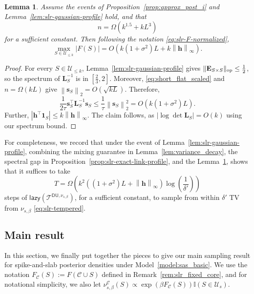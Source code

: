 \documentclass[11pt]{article}
\newtheorem{lemma}{Lemma}
\newcommand{\defeq}{:=}
\newcommand{\norm}[1]{\left\lVert#1\right\rVert}
\newcommand{\normsop}[1]{\lVert#1\rVert_{\textup{op}}}
\newcommand{\half}{\frac{1}{2}}
\newcommand{\1}{\mathbf{1}}
\newcommand{\0}{\mathbf{0}}
\newcommand{\ind}{\mathbb{I}}
\newcommand{\Par}[1]{\left(#1\right)}
\newcommand{\Abs}[1]{\left|#1\right|}
\newcommand{\sig}{\sigma}
\newcommand{\twonorm}[1]{\norm{#1}_2}
\newcommand{\lazy}{\mathsf{lazy}}
\newcommand{\me}{{\mathbf{E}}}
\newcommand{\ml}{{\mathbf{L}}}
\newcommand{\vh}{{\mathbf{h}}}
\newcommand{\vs}{{\mathbf{s}}}
\newcommand{\calC}{{\mathcal{C}}}
\newcommand{\calT}{{\mathcal{T}}}
\newcommand{\calU}{{\mathcal{U}}}
\newcommand{\TDU}[1]{\calT^{\mathsf{DU}, #1}}
\begin{document}
\begin{lemma}
\label{lem:slr-exact-range}
Assume the events of Proposition~\ref{prop:approx_post_i} and Lemma~\ref{lem:slr-gaussian-profile} hold, and that
\[n = \Omega\Par{k^{1.5} + kL^3}\]
for a sufficient constant. Then following the notation \eqref{eq:slr-F-normalized},
\[
    \max_{S\in\calU_{\le k}} |F(S)|
    = O\Par{k\Par{1 + \sig^2}L + k\norm{\vh}_\infty}.
\]
\end{lemma}

\begin{proof}
For every $S \in \calU_{\le k}$, Lemma~\ref{lem:slr-gaussian-profile} gives $\normsop{\me_{S \times S}} \le \half$, so the spectrum of $\ml_S^{-1}$ is in $[\frac 2 3, 2]$. Moreover, \eqref{eq:short_flat_scaled} and $n = \Omega(kL)$ give $\twonorm{\vs_S} = O(\sqrt{kL})$. Therefore,
\[
    \frac{1}{2\tau}
    \vs_S^\top\ml_S^{-1}\vs_S
    \le
    \frac{1}{\tau}\twonorm{\vs_S}^2
   = O\Par{k (1 + \sig^2) L}.
\]
Further, $|\vh^\top \1_S| \le k\norm{\vh}_\infty$. The claim follows, as $\Abs{\log\det\ml_S} = O(k)$ using our spectrum bound.
\end{proof}

For completeness, we record that under the event of Lemma~\ref{lem:slr-gaussian-profile}, combining the mixing guarantee in Lemma~\ref{lem:variance_decay}, the spectral gap in Proposition~\ref{prop:slr-exact-link-profile}, and the Lemma~\ref{lem:slr-exact-range}, shows that it suffices to take
\begin{equation}\label{eq:mixing_time_slr}
T = \Omega\Par{k^2\Par{\Par{1 + \sig^2}L + \norm{\vh}_\infty} \log\Par{\frac 1 {\delta'}}}
\end{equation}
steps of $\lazy(\TDU{\nu_{s,\beta}})$, 
for a sufficient constant, to sample from within $\delta'$ TV from $\nu_{s, \beta}$ \eqref{eq:slr-tempered}.
\subsection{Main result}
\label{ssec:main_slr}


In this section, we finally put together the pieces to give our main sampling result for spike-and-slab posterior densities under Model~\ref{model:sas_basic}. We use the notation $F_\calC(S) \defeq F(\calC \cup S)$ defined in Remark~\ref{rem:slr_fixed_core}, and for notational simplicity, we also let $\nu^{\calC}_{s,\beta}(S) \propto \exp(\beta F_{\calC}(S)) \ind(S \in \calU_{s})$.
\end{document}
